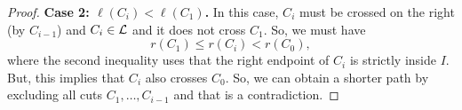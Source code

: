 \begin{proof}
{\bf Case 2: $\ell(C_i)<\ell(C_1)$.} In this case, $C_i$ must be crossed on the right (by $C_{i-1}$) and $C_i\in {\cal L}$ and it does not cross $C_1$. So, we must have
$$ r(C_1) \leq r(C_i) < r(C_0), $$
where the second inequality uses that the right endpoint of $C_i$ is strictly inside $I$. But, this implies that $C_i$ also crosses $C_0$. So, we can obtain a shorter path by excluding all cuts $C_1,\dots, C_{i-1}$ and that is a contradiction.
%
%
%

\end{proof}

